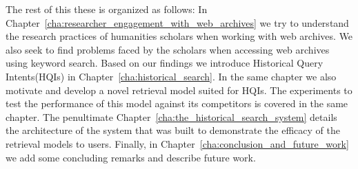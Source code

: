 The rest of this these is organized as follows: In Chapter~\ref{cha:researcher_engagement_with_web_archives} we try to understand the research practices of humanities scholars when working with web archives. We also seek to find problems faced by the scholars when accessing web archives using keyword search. Based on our findings we introduce Historical Query Intents(HQIs) in Chapter~\ref{cha:historical_search}. In the same chapter we also motivate and develop a novel retrieval model suited for HQIs. The experiments to test the performance of this model against its competitors is covered in the same chapter. The penultimate Chapter~\ref{cha:the_historical_search_system} details the architecture of the system that was built to demonstrate the efficacy of the retrieval models to users. Finally, in Chapter~\ref{cha:conclusion_and_future_work} we add some concluding remarks and describe future work.

